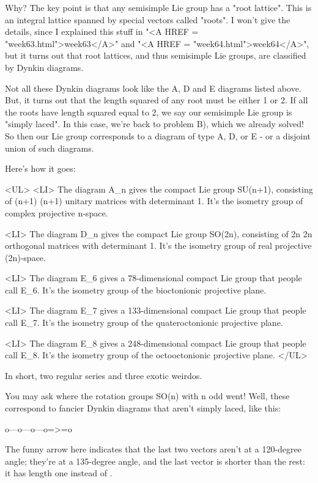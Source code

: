 Why?  The key point is that any semisimple Lie group 
has a "root lattice".  
This is an integral lattice spanned by special vectors 
called "roots".  
I won't give the details, since I explained this 
stuff in "<A HREF = "week63.html">week63</A>" 
and "<A HREF = "week64.html">week64</A>", but it turns out 
that root lattices, and thus semisimple 
Lie groups, are classified by Dynkin diagrams.  

Not all these Dynkin diagrams look like the A, D and E diagrams listed
above.  But, it turns out that the length squared of any root must be 
either 1 or 2.  If all the roots have length squared equal to 2, we
say our semisimple Lie group is "simply laced".  In this case, we're
back to problem B), which we already solved!  So then our Lie group 
corresponds to a diagram of type A, D, or E - or a disjoint union of 
such diagrams.

Here's how it goes:

<UL>
<LI>
 The diagram A_{n} gives the compact Lie group SU(n+1), 
  consisting of (n+1) \times  (n+1) unitary matrices with determinant 1.  
  It's the isometry group of complex projective n-space.

<LI>
 The diagram D_{n} gives the compact Lie group SO(2n), 
  consisting of 2n \times  2n orthogonal matrices with determinant 1.
  It's the isometry group of real projective (2n)-space.

<LI>
 The diagram E_{6} gives a 78-dimensional compact Lie group
  that people call E_{6}.  It's the isometry group of the bioctonionic
  projective plane.

<LI>
 The diagram E_{7} gives a 133-dimensional compact Lie group
  that people call E_{7}.  It's the isometry group of the quateroctonionic
  projective plane.

<LI>
 The diagram E_{8} gives a 248-dimensional compact Lie group
  that people call E_{8}.  It's the isometry group of the octooctonionic 
  projective plane.
</UL>

In short, two regular series and three exotic weirdos.  

You may ask where the rotation groups SO(n) with n odd went!  
Well, these correspond to fancier Dynkin diagrams that aren't
simply laced, like this:

 o---o---o---o=>=o

The funny arrow here indicates that the last two vectors aren't 
at a 120-degree angle; they're at a 135-degree angle, and the last
vector is shorter than the rest: it has length one instead of .

